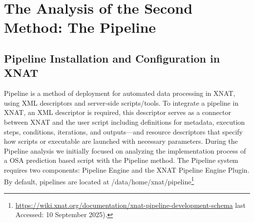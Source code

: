 \chapter{The Analysis of the Second Method: The Pipeline}
\section{Pipeline Installation and Configuration in XNAT}

Pipeline is a method of deployment for automated data processing in XNAT, using \ac{XML} descriptors and server-side scripts/tools. 
To integrate a pipeline in XNAT, an XML descriptor is required, this descriptor serves as a connector between XNAT and the user script including definitions for metadata, execution steps, conditions, iterations, and outputs—and resource descriptors that specify how scripts or executable are launched with necessary parameters.
During the Pipeline analysis we initially focused on analyzing the implementation process of a OSA prediction based script with the Pipeline method. The Pipeline system requires two components: Pipeline Engine and the XNAT Pipeline Engine Plugin. By default, pipelines are located at /data/home/xnat/pipeline\footnote{\url{https://wiki.xnat.org/documentation/xnat-pipeline-development-schema} last Accessed: 10 September 2025).}   

